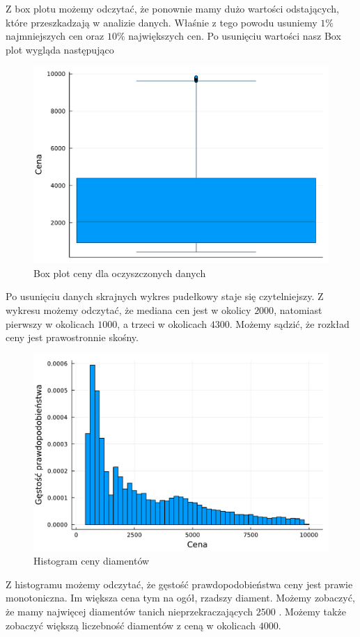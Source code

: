 \documentclass[12pt]{article}
\theoremstyle{exer}
\begin{document}
	Z box plotu możemy odczytać, że ponownie mamy dużo wartości odstających, które przeszkadzają w analizie danych. Właśnie z tego powodu usuniemy $ 1 \% $ najmniejszych cen oraz  $ 10\%$ największych cen.
	Po usunięciu wartości nasz Box plot wygląda następująco
	\begin{figure}[H]
		\centering
		\includegraphics[width=4\columnwidth/5]{images/boxplot_price_danych_oczyszczonych.pdf}
		\caption{Box plot ceny dla oczyszczonych danych}
		\label{fig:box_price}
	\end{figure}
	Po usunięciu danych skrajnych wykres pudełkowy staje się czytelniejszy. Z wykresu możemy odczytać, że mediana cen jest w okolicy $2000$, natomiast pierwszy w okolicach $1000$, a trzeci w okolicach $4300$. Możemy sądzić, że rozkład ceny jest prawostronnie skośny.
	
	\begin{figure}[H]
		\centering
		\includegraphics[width=4\columnwidth/5]{images/histogram_price.pdf}
		\caption{Histogram ceny diamentów}
		\label{fig:hist_price}
	\end{figure}
 Z histogramu możemy odczytać, że gęstość prawdopodobieństwa ceny jest prawie monotoniczna. Im większa cena tym na ogół, rzadszy diament. Możemy zobaczyć, że mamy najwięcej diamentów tanich nieprzekraczających $2500$ . Możemy także zobaczyć większą liczebność diamentów z ceną w okolicach $4000$. 
 
\end{document}
